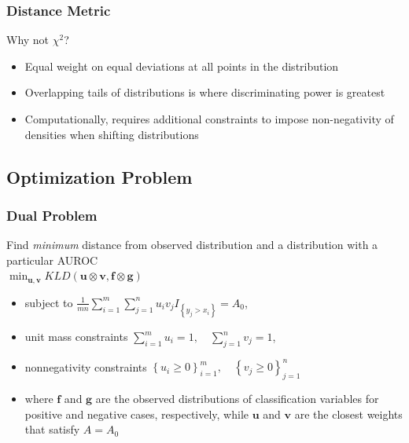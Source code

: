 \documentclass{beamer}
\begin{document}

\begin{frame}
\frametitle{Distance Metric}

Why not $\chi^2$?
\begin{itemize}
    \item Equal weight on equal deviations at all points in the distribution
    \item Overlapping tails of distributions is where discriminating power is greatest
    \item Computationally, requires additional constraints to impose non-negativity of densities when shifting distributions
\end{itemize}

\end{frame}



\subsection{Optimization Problem}



\begin{frame}
\frametitle{Dual Problem}

Find \emph{minimum} distance from observed distribution and a distribution with a particular AUROC \\
$\min_{\mathbf{u}, \mathbf{v}}
        KLD(\mathbf{u} \otimes \mathbf{v}, \mathbf{f} \otimes \mathbf{g})$
\begin{itemize}
    \item subject to
    $\frac{1}{m n} \sum_{i = 1}^{m} \sum_{j = 1}^{n} u_i v_j I_{\left\{ y_j > x_i \right\}} = A_0$,
    \item unit mass constraints
    $\sum_{i = 1}^{m} u_i = 1, \quad \sum_{j = 1}^{n} v_j = 1$,
    \item nonnegativity constraints
    $ \left\{ u_i  \geq 0 \right\}_{i=1}^{m}, \quad \left\{ v_j \geq 0 \right\}_{j=1}^{n}$
    \item where $\mathbf{f}$ and $\mathbf{g}$ are the observed distributions of classification variables for positive and negative cases, respectively,
    while $\mathbf{u}$ and $\mathbf{v}$ are the closest weights that satisfy $A = A_0$
\end{itemize}

\end{frame}
\end{document}
